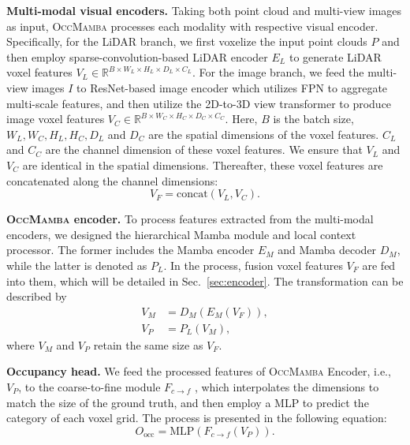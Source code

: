 \documentclass[10pt,twocolumn,letterpaper]{article}
\newcommand{\methodname}{\textsc{OccMamba}}
\begin{document}
\textbf{Multi-modal visual encoders.}
Taking both point cloud and multi-view images as input, \methodname{} processes each modality with respective visual encoder. Specifically, for the LiDAR branch, we first voxelize the input point clouds $P$ \cite{yinzhouandonceltuzel2018} and then employ sparse-convolution-based LiDAR encoder $E_L$ \cite{yanyan2018} to generate LiDAR voxel features $V_L \in \mathbb{R}^{B \times W_L \times H_L \times D_L \times C_L}$. For the image branch, we feed the multi-view images $I$ to ResNet-based image encoder \cite{tridao} which utilizes FPN \cite{youquanliu2013} to aggregate multi-scale features, and then utilize the 2D-to-3D view transformer \cite{zhijianliu} to produce image voxel features $V_C \in \mathbb{R}^{B \times W_C \times H_C \times D_C \times C_C}$. Here, $B$ is the batch size, $W_L, W_C, H_L, H_C, D_L$ and $D_C$ are the spatial dimensions of the voxel features. $C_L$ and $C_C$ are the channel dimension of these voxel features. We ensure that $V_L$ and $V_C$ are identical in the spatial dimensions. Thereafter, these voxel features are concatenated along the channel dimensions:
\begin{equation}
  V_F = \text{concat}(V_L, V_C). \label{eq:concat}
\end{equation}

\textbf{\methodname{} encoder.}
To process features extracted from the multi-modal encoders, we designed the hierarchical Mamba module and local context processor. The former includes the Mamba encoder $E_M$ and Mamba decoder $D_M$, while the latter is denoted as $P_L$. In the process, fusion voxel features $V_F$ are fed into them, which will be detailed in Sec.~\ref{sec:encoder}. The transformation can be described by
\begin{align}
  V_M &= D_M(E_M(V_F)), \label{eq:mamba_enc} \\
  V_P &= P_L(V_M), \label{eq:local_proc}
\end{align}
where $V_M$ and $V_P$ retain the same size as $V_F$.

\textbf{Occupancy head.}
We feed the processed features of \methodname{} Encoder, i.e., $V_P$, to the coarse-to-fine module $F_{c \to f}$ \cite{luisroldao}, which interpolates the dimensions to match the size of the ground truth, and then employ a MLP to predict the category of each voxel grid. The process is presented in the following equation:
\begin{equation}
  O_\text{occ} = \text{MLP}(F_{c \to f}(V_P)). \label{eq:head}
\end{equation}
\end{document}
